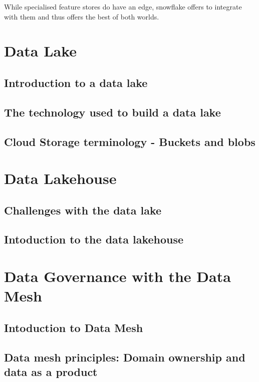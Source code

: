 \documentclass[a4paper, 11pt]{article}
\begin{document}
    While specialised feature stores do have an edge, snowflake offers to integrate with them and thus offers the best of both worlds.

    \section{Data Lake}

    \subsection{Introduction to a data lake}
    
    \subsection{The technology used to build a data lake}
    
    \subsection{Cloud Storage terminology - Buckets and blobs}
    
    \section{Data Lakehouse}
    
    \subsection{Challenges with the data lake}
    
    \subsection{Intoduction to the data lakehouse}

    \section{Data Governance with the Data Mesh}
    
    \subsection{Intoduction to Data Mesh}

    \subsection{Data mesh principles: Domain ownership and data as a product}
\end{document}
